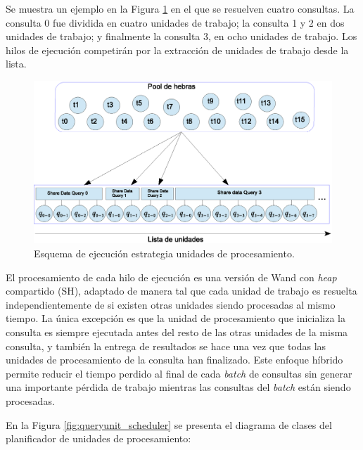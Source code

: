 Se muestra un ejemplo en la Figura \ref{fig:queryunit_execution} en el que se resuelven cuatro consultas. La consulta 0 fue dividida en cuatro unidades de trabajo; la consulta 1 y 2 en dos unidades de trabajo; y finalmente la consulta 3, en ocho unidades de trabajo. Los hilos de ejecución competirán por la extracción de unidades de trabajo desde la lista.

\begin{figure}[!th]
\centering
\includegraphics[scale=.75]{images/QueryUnitExecution.eps}
\caption{Esquema de ejecución estrategia unidades de procesamiento.}
\label{fig:queryunit_execution}
\end{figure}

El procesamiento de cada hilo de ejecución es una versión de Wand con \textit{heap} compartido (SH), adaptado de manera tal que cada unidad de trabajo es resuelta independientemente de si existen otras unidades siendo procesadas al mismo tiempo. La única excepción es que la unidad de procesamiento que inicializa la consulta es siempre ejecutada antes del resto de las otras unidades de la misma consulta, y también la entrega de resultados se hace una vez que todas las unidades de procesamiento de la consulta han finalizado. Este enfoque híbrido permite reducir el tiempo perdido al final de cada \textit{batch} de consultas sin generar una importante pérdida de trabajo mientras las consultas del \textit{batch} están siendo procesadas.

En la Figura \ref{fig:queryunit_scheduler} se presenta el diagrama de clases del planificador de unidades de procesamiento:

